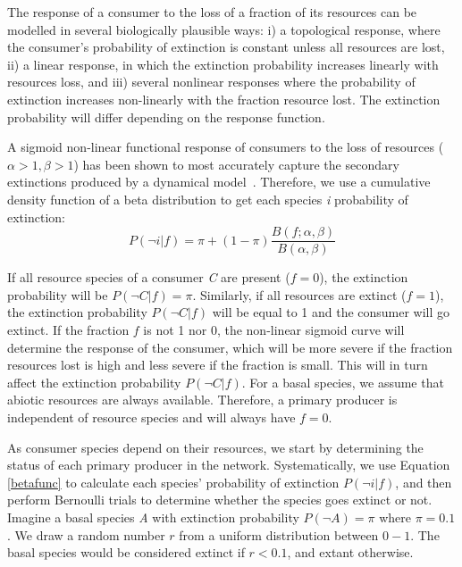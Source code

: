 \documentclass[12pt]{article}
\begin{document}
\begin{spacing}{2.0}
        The response of a consumer to the loss of a fraction of its resources can be modelled in several biologically plausible ways: i) a topological response, where the consumer's probability of extinction is constant unless all resources are lost, ii) a linear response, in which the extinction probability increases linearly with resources loss, and iii) several nonlinear responses where the probability of extinction increases non-linearly with the fraction resource lost. 
        The extinction probability will differ depending on the response function.
        
        
        A sigmoid non-linear functional response of consumers to the loss of resources ($\alpha >1, \beta >1$) has been shown to most accurately capture the secondary extinctions produced by a dynamical model~\citep{Eklof2013}.
        Therefore, we use a cumulative density function of a beta distribution to get each species \textit{i} probability of extinction:
        \begin{equation}
        \label{betafunc}
        P(\lnot i|f) = \pi + (1 - \pi) \frac{B(f;\alpha,\beta)}{B(\alpha,\beta)}
        \end{equation}
        

        \noindent If all resource species of a consumer \textit{C} are present ($f = 0$), the extinction probability will be $P(\lnot C|f) = \pi$. 
        Similarly, if all resources are extinct ($f = 1$), the extinction probability $P(\lnot C|f)$ will be equal to 1 and the consumer will go extinct.
        If the fraction $f$ is not 1 nor 0, the non-linear sigmoid curve will determine the response of the consumer, which will be more severe if the fraction resources lost is high and less severe if the fraction is small. This will in turn affect the extinction probability $P(\lnot C|f)$. 
        For a basal species, we assume that abiotic resources are always available. Therefore, a primary producer is independent of resource species and will always have $f = 0$.  
        

        As consumer species depend on their resources, we start by determining the status of each primary producer in the network.
        Systematically, we use Equation \ref{betafunc} to calculate each species' probability of extinction $P(\lnot i|f)$, and then perform Bernoulli trials to determine whether the species goes extinct or not. 
        Imagine a basal species \textit{A} with extinction probability $P(\lnot A) = \pi$ where $\pi = 0.1$. We draw a random number $r$ from a uniform distribution between $0-1$. The basal species would be considered extinct if $r < 0.1$, and extant otherwise. 
        

\end{spacing}
\end{document}
